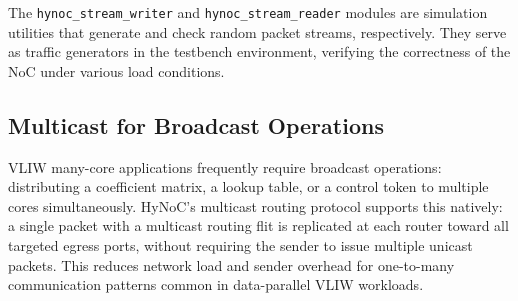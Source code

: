 The \texttt{hynoc\_stream\_writer} and \texttt{hynoc\_stream\_reader} modules are
simulation utilities that generate and check random packet streams, respectively.
They serve as traffic generators in the testbench environment, verifying the
correctness of the NoC under various load conditions.

\subsection{Multicast for Broadcast Operations}

VLIW many-core applications frequently require broadcast operations: distributing
a coefficient matrix, a lookup table, or a control token to multiple cores
simultaneously. HyNoC's multicast routing protocol supports this natively: a
single packet with a multicast routing flit is replicated at each router toward
all targeted egress ports, without requiring the sender to issue multiple unicast
packets. This reduces network load and sender overhead for one-to-many
communication patterns common in data-parallel VLIW workloads.
